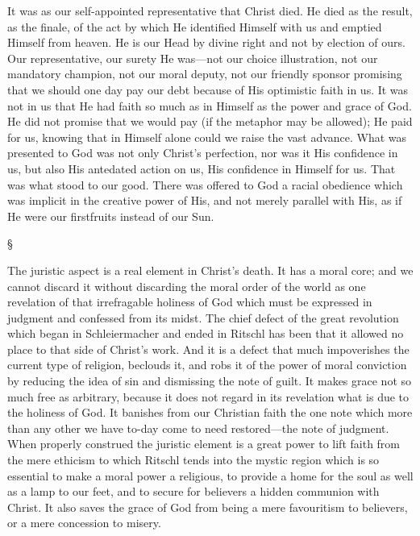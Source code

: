 \documentclass[12pt,a5paper,twoside,titlepage]{book}
\begin{document}
It was as our self-appointed representative 
that Christ died. He died as the result, as the 
finale, of the act by which He identified Himself 
with us and emptied Himself from heaven. He 
is our Head by divine right and not by election of 
ours. Our representative, our surety He was---not 
our choice illustration, not our mandatory 
champion, not our moral deputy, not our friendly 
sponsor promising that we should one day pay 
our debt because of His optimistic faith in us. 
It was not in us that He had faith so much as in 
Himself as the power and grace of God. He did 
not promise that we would pay (if the metaphor 
may be allowed); He paid for us, knowing that in 
Himself alone could we raise the vast advance. 
What was presented to God was not only 
Christ's perfection, nor was it His confidence in 
us, but also His antedated action on us, His confidence 
in Himself for us. That was what stood 
to our good. There was offered to God a racial 
obedience which was implicit in the creative 
power of His, and not merely parallel with His, 
as if He were our firstfruits instead of our Sun. 

\begin{center}
\S
\end{center}

The juristic aspect is a real element in Christ's 
death. It has a moral core; and we cannot 
discard it without discarding the moral order of 
the world as one revelation of that irrefragable 
holiness of God which must be expressed in 
judgment and confessed from its midst. The 
chief defect of the great revolution which began 
in Schleiermacher and ended in Ritschl has 
been that it allowed no place to that side of 
Christ's work. And it is a defect that much 
impoverishes the current type of religion, beclouds 
it, and robs it of the power of moral conviction 
by reducing the idea of sin and dismissing 
the note of guilt. It makes grace not so much 
free as arbitrary, because it does not regard in 
its revelation what is due to the holiness of God. 
It banishes from our Christian faith the one 
note which more than any other we have to-day 
come to need restored---the note of judgment. 
When properly construed the juristic element is 
a great power to lift faith from the mere 
ethicism to which Ritschl tends into the mystic 
region which is so essential to make a moral 
power a religious, to provide a home for the 
soul as well as a lamp to our feet, and to secure 
for believers a hidden communion with Christ. 
It also saves the grace of God from being a 
mere favouritism to believers, or a mere concession 
to misery. 
\end{document}
